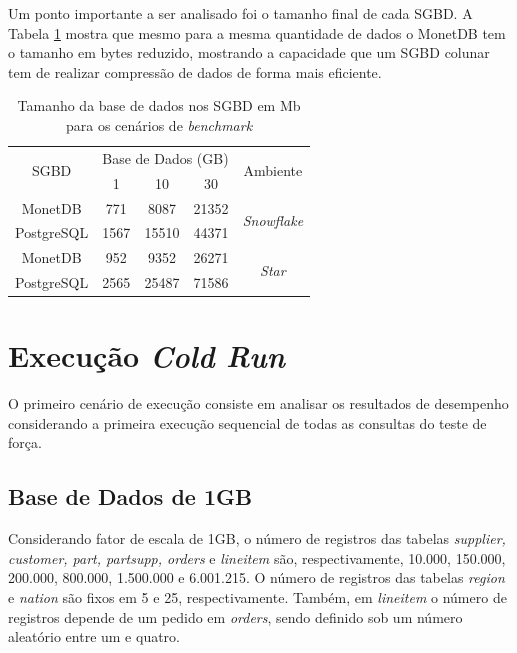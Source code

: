 Um ponto importante a ser analisado foi o tamanho final de cada SGBD. A Tabela \ref{tab:carregamento_size} 
mostra que mesmo para a mesma quantidade de dados o MonetDB tem o tamanho em bytes reduzido, mostrando a capacidade 
que um SGBD colunar tem de realizar compressão de dados de forma mais eficiente.

\begin{table}[htpb]
    \centering
    \caption{Tamanho da base de dados nos SGBD em Mb para os cenários de \textit{benchmark}}
    \label{tab:carregamento_size}
    \begin{tabular}{c|ccc|c}
        \hline
        \multirow{2}{*}{SGBD} & \multicolumn{3}{c|}{Base de Dados (GB)} & \multirow{2}{*}{Ambiente}  \\
                              & 1           & 10          & 30          &                            \\ \hline
        MonetDB               & 771         & 8087        & 21352       & \multirow{2}{*}{\textit{Snowflake}} \\
        PostgreSQL            & 1567        & 15510       & 44371       &                            \\ \hline
        MonetDB               & 952         & 9352        & 26271       & \multirow{2}{*}{\textit{Star}}      \\
        PostgreSQL            & 2565        & 25487       & 71586       &                            \\ \hline
        \end{tabular}
    \end{table}


\section{Execução \textit{Cold Run}}

O primeiro cenário de execução consiste em analisar os resultados de desempenho considerando a primeira execução sequencial de todas as consultas do teste de força. 

\subsection{Base de Dados de 1GB}

Considerando fator de escala de 1GB, o número de registros das tabelas \textit{supplier, customer, part, partsupp, orders} e \textit{lineitem} são, respectivamente, 10.000, 150.000, 200.000, 800.000, 1.500.000 e 6.001.215. O número de registros das tabelas \textit{region} e \textit{nation} são fixos em 5 e 25, respectivamente. Também, em \textit{lineitem} o número de registros depende de um pedido em \textit{orders}, sendo definido sob um número aleatório entre um e quatro.

